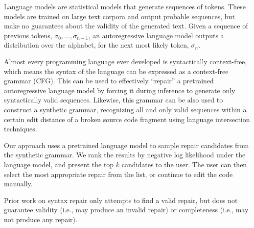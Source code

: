 \documentclass[runningheads]{llncs}
\begin{document}
Language models are statistical models that generate sequences of tokens. These models are trained on large text corpora and output probable sequences, but make no guarantees about the validity of the generated text. Given a sequence of previous tokens, $\sigma_{0}, \ldots, \sigma_{n-1}$, an autoregressive language model outputs a distribution over the alphabet, for the next most likely token, $\sigma_n$.

Almost every programming language ever developed is syntactically context-free, which means the syntax of the language can be expressed as a context-free grammar (CFG). This can be used to effectively ``repair'' a pretrained autoregressive language model by forcing it during inference to generate only syntactically valid sequences. Likewise, this grammar can be also used to construct a synthetic grammar, recognizing all and only valid sequences within a certain edit distance of a broken source code fragment using language intersection techniques.

Our approach uses a pretrained language model to sample repair candidates from the synthetic grammar. We rank the results by negative log likelihood under the language model, and present the top $k$ candidates to the user. The user can then select the most appropriate repair from the list, or continue to edit the code manually.

Prior work on syntax repair only attempts to find a valid repair, but does not guarantee validity (i.e., may produce an invalid repair) or completeness (i.e., may not produce any repair).
\end{document}
